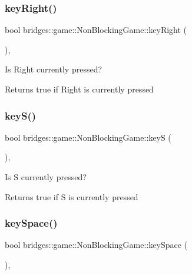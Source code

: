 \subsubsection{\texorpdfstring{key\+Right()}{keyRight()}}
{\footnotesize\ttfamily bool bridges\+::game\+::\+Non\+Blocking\+Game\+::key\+Right (\begin{DoxyParamCaption}{ }\end{DoxyParamCaption})\hspace{0.3cm}{\ttfamily [inline]}, {\ttfamily [protected]}}



Is Right currently pressed? 

\begin{DoxyReturn}{Returns}
true if Right is currently pressed 
\end{DoxyReturn}
\mbox{\label{classbridges_1_1game_1_1_non_blocking_game_a75ece5d4fa35893ecacc82c5064c05e0}} 
\subsubsection{\texorpdfstring{key\+S()}{keyS()}}
{\footnotesize\ttfamily bool bridges\+::game\+::\+Non\+Blocking\+Game\+::keyS (\begin{DoxyParamCaption}{ }\end{DoxyParamCaption})\hspace{0.3cm}{\ttfamily [inline]}, {\ttfamily [protected]}}



Is S currently pressed? 

\begin{DoxyReturn}{Returns}
true if S is currently pressed 
\end{DoxyReturn}
\mbox{\label{classbridges_1_1game_1_1_non_blocking_game_a54beca154b58b0e0fb26c75983ba5072}} 
\subsubsection{\texorpdfstring{key\+Space()}{keySpace()}}
{\footnotesize\ttfamily bool bridges\+::game\+::\+Non\+Blocking\+Game\+::key\+Space (\begin{DoxyParamCaption}{ }\end{DoxyParamCaption})\hspace{0.3cm}{\ttfamily [inline]}, {\ttfamily [protected]}}



